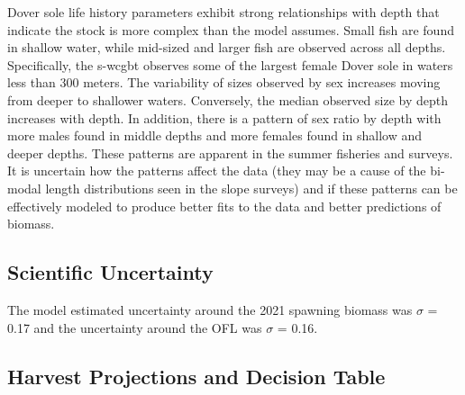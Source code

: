 \documentclass[11pt,
  english,
  a4paper,
]{article}
\begin{document}
\leavevmode\tagmcend\tagstructend\par


Dover sole life history parameters exhibit strong relationships with depth that indicate the stock is more complex than the model assumes. Small fish are found in shallow water, while mid-sized and larger fish are observed across all depths. Specifically, the \gls{s-wcgbt} observes some of the largest female Dover sole in waters less than 300 meters. The variability of sizes observed by sex increases moving from deeper to shallower waters. Conversely, the median observed size by depth increases with depth. In addition, there is a pattern of sex ratio by depth with more males found in middle depths and more females found in shallow and deeper depths. These patterns are apparent in the summer fisheries and surveys. It is uncertain how the patterns affect the data (they may be a cause of the bi-modal length distributions seen in the slope surveys) and if these patterns can be effectively modeled to produce better fits to the data and better predictions of biomass.

\leavevmode\tagmcend\tagstructend\par


\hypertarget{scientific-uncertainty}{%
\subsection*{Scientific Uncertainty}\label{scientific-uncertainty}}

\leavevmode\tagmcend\tagstructend


The model estimated uncertainty around the 2021 spawning biomass was {\(\sigma\)\leavevmode\tagmcend\tagstructend} = 0.17 and the uncertainty around the OFL was {\(\sigma\)\leavevmode\tagmcend\tagstructend} = 0.16.

\leavevmode\tagmcend\tagstructend\par


\hypertarget{harvest-projections-and-decision-table}{%
\subsection*{Harvest Projections and Decision Table}\label{harvest-projections-and-decision-table}}
\end{document}
